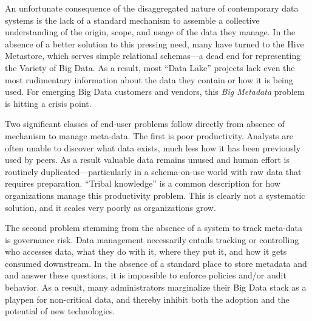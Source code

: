 \documentclass{sig-alternate}
\begin{document}
An unfortunate consequence of the disaggregated nature of contemporary data systems
is the lack of a standard mechanism
to assemble a collective understanding of the origin, scope, and usage of the data they manage.
In the absence of a better solution to this pressing need,
many have turned to the 
Hive Metastore, which serves simple relational schemas---a dead end for representing the Variety of Big Data. 
As a result, most ``Data Lake'' projects lack 
even the most rudimentary information about the data they contain or how it is being used. 
For emerging Big Data customers and vendors, this \emph{Big Metadata} problem is hitting a crisis point.  

Two significant classes of end-user problems follow directly from absence of mechanism to manage meta-data.
The first is poor productivity.
Analysts are often unable to discover what data exists, much less how it has been previously used by peers. 
As a result valuable data remains unused
and human effort is routinely duplicated---particularly in a schema-on-use world with raw data that requires preparation.  
``Tribal knowledge'' is a common description for how organizations manage this productivity problem. 
This is clearly not a systematic solution, and it scales very poorly as organizations grow.

The second problem 
stemming from the absence of a system to track meta-data 
is governance risk. 
Data management necessarily entails tracking or controlling who accesses data, what they do with it, where they put it, and how it gets consumed downstream. 
In the absence of a standard place to store metadata and and answer these questions, it is impossible to enforce policies and/or audit behavior. 
As a result, many administrators marginalize their Big Data stack as a playpen for non-critical data, and thereby inhibit both the adoption and the potential of new technologies.
\end{document}
